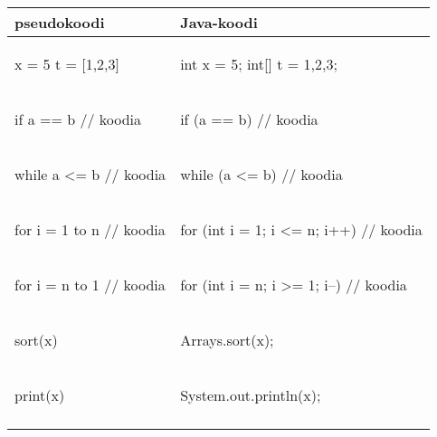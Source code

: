 \begin{table}
\center
\begin{tabular}{ll}
pseudokoodi & Java-koodi \\
\hline
\begin{smallcode}[xleftmargin=0pt]
x = 5
t = [1,2,3]
\end{smallcode}
&
\begin{smallcode}
int x = 5;
int[] t = {1,2,3};
\end{smallcode}
\\
\begin{smallcode}[xleftmargin=0pt]
if a == b
    // koodia
\end{smallcode}
&
\begin{smallcode}
if (a == b) {
    // koodia
}
\end{smallcode}
\\
\begin{smallcode}[xleftmargin=0pt]
while a <= b
    // koodia
\end{smallcode}
&
\begin{smallcode}
while (a <= b) {
    // koodia
}
\end{smallcode}
\\
\begin{smallcode}[xleftmargin=0pt]
for i = 1 to n
    // koodia
\end{smallcode}
&
\begin{smallcode}
for (int i = 1; i <= n; i++) {
    // koodia
}
\end{smallcode}
\\
\begin{smallcode}[xleftmargin=0pt]
for i = n to 1
    // koodia
\end{smallcode}
&
\begin{smallcode}
for (int i = n; i >= 1; i--) {
    // koodia
}
\end{smallcode}
\\
\begin{smallcode}[xleftmargin=0pt]
sort(x)
\end{smallcode}
&
\begin{smallcode}
Arrays.sort(x);
\end{smallcode}
\\
\begin{smallcode}[xleftmargin=0pt]
print(x)
\end{smallcode}
&
\begin{smallcode}
System.out.println(x);
\end{smallcode}
\\
\begin{smallcode}[xleftmargin=0pt]

\end{smallcode}
\end{tabular}
\end{table}
